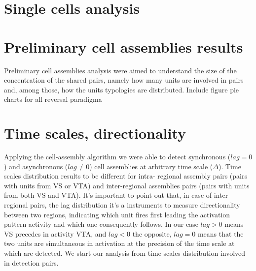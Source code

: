 \section{Single cells analysis}
\section{Preliminary cell assemblies results}
Preliminary cell assemblies analysis were aimed to understand the size of the concentration of the shared pairs, namely how many units are involved in pairs and, among those, how the units typologies are distributed.
{\color{red} Include figure pie charts for all reversal paradigma}
\section{Time scales, directionality}
Applying the cell-assembly algorithm we were able to detect synchronous ($lag=0$) and asynchronous ($lag\neq 0$) cell assemblies at arbitrary time scale ($\Delta$). Time scales distribution results to be different for intra- regional assembly pairs (pairs with units from VS or VTA) and inter-regional assemblies pairs (pairs with units from both VS and VTA). It's important to point out that, in case of inter-regional pairs, the lag distribution it's a instruments to measure directionality between two regions, indicating which unit fires first leading the activation pattern activity and which one consequently follows. In our case $lag >0$ means VS precedes in activity VTA, and $lag <0$ the opposite, $lag=0$ means that the two units are  simultaneous in activation at the precision of the time scale at which are detected.
We start our analysis from time scales distribution involved in detection pairs.
